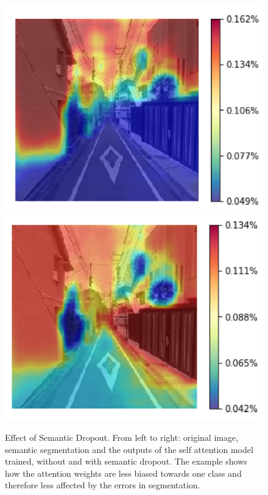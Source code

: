 \begin{figure}[!htb]
		\includegraphics[width=\linewidth]{figures/segrank_sample.png}
	\endminipage\hfill
		\includegraphics[width=\linewidth]{figures/segattn_sample.png}
	\endminipage
	\caption[Effect of Semantic Dropout]{
		Effect of Semantic Dropout. From left to right: original image, semantic segmentation
		and the outputs of the self attention model trained, without and with semantic dropout.
		The example shows how the attention weights are less biased towards one class and therefore
		less affected by the errors in segmentation.
	}
	\label{fig:dropout}
\end{figure}

